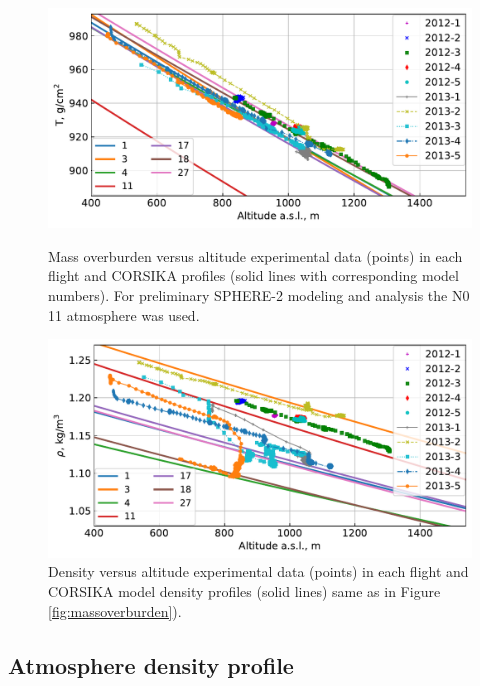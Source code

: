 \documentclass[universe,article,submit,moreauthors,pdftex]{Definitions/mdpi}
\begin{document}
\begin{figure}[tb]
    \begin{minipage}[t]{0.48\textwidth}
       \centering
       \includegraphics[width=\textwidth]{figs/atmosphere_T.pdf}
       \caption{Mass overburden versus altitude experimental data (points) in each flight and CORSIKA profiles (solid lines with corresponding model numbers). For preliminary SPHERE-2 modeling and analysis the N0 11 atmosphere was used.}
        \label{fig:massoverburden}
    \end{minipage}
    \hfill
    \begin{minipage}[t]{0.48\textwidth}
        \centering
        \includegraphics[width=\textwidth]{figs/atmosphere_rho.pdf}
        \caption{Density versus altitude experimental data (points) in each flight and CORSIKA model density profiles (solid lines) same as in Figure \ref{fig:massoverburden}).}
        \label{fig:density}
   \end{minipage}
\end{figure}


\subsection{Atmosphere density profile}
\label{sect:atmosphere-profile}
\end{document}

